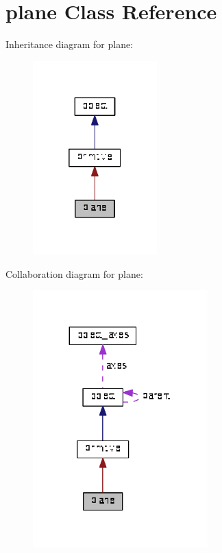 \hypertarget{classplane}{}\section{plane Class Reference}
\label{classplane}


Inheritance diagram for plane\+:\nopagebreak
\begin{figure}[H]
\begin{center}
\leavevmode
\includegraphics[width=136pt]{classplane__inherit__graph}
\end{center}
\end{figure}


Collaboration diagram for plane\+:\nopagebreak
\begin{figure}[H]
\begin{center}
\leavevmode
\includegraphics[width=191pt]{classplane__coll__graph}
\end{center}
\end{figure}
